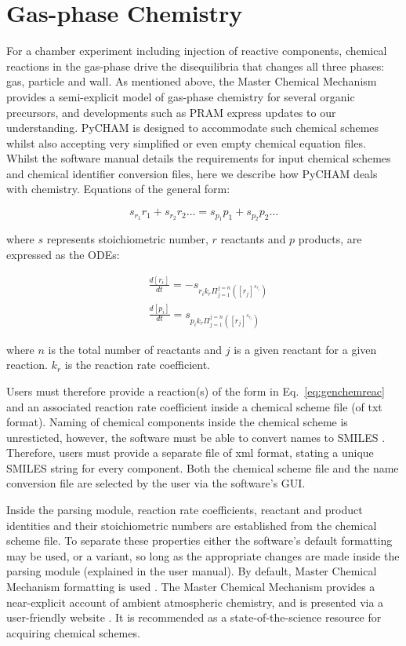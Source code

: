 \documentclass[gmd, manuscript]{copernicus}
\begin{document}
\section{Gas-phase Chemistry}

For a chamber experiment including injection of reactive components, chemical reactions in the gas-phase drive the disequilibria that changes all three phases: gas, particle and wall.  As mentioned above, the Master Chemical Mechanism provides a semi-explicit model of gas-phase chemistry for several organic precursors, and developments such as PRAM express updates to our understanding.  PyCHAM is designed to accommodate such chemical schemes whilst also accepting very simplified or even empty chemical equation files.  Whilst the software manual details the requirements for input chemical schemes and chemical identifier conversion files, here we describe how PyCHAM deals with chemistry.  Equations of the general form:

\begin{equation} \label{eq:genchemreac}
s_{r_{1}}r_{1}+s_{r_{2}}r_{2} \ldots=s_{p_{1}}p_{1}+s_{p_{2}}p_{2}\ldots
\end{equation}

where $s$ represents stoichiometric number, $r$ reactants and $p$ products, are expressed as the ODEs:

\begin{align} \label{eq:genchemode}
	&\frac{d[r_{i}]}{dt} = -s_{r_{i}k_r\Pi_{j=1}^{j=n}\left([r_j]^{s_{r_{j}}}\right)}\\
	&\frac{d[p_{i}]}{dt} = s_{p_{i}k_r\Pi_{j=1}^{j=n}\left([r_j]^{s_{r_{j}}}\right)} 
\end{align}

where $n$ is the total number of reactants and $j$ is a given reactant for a given reaction.  $k_r$ is the reaction rate coefficient.

Users must therefore provide a reaction(s) of the form in Eq.~\ref{eq:genchemreac} and an associated reaction rate coefficient inside a chemical scheme file (of txt format).  Naming of chemical components inside the chemical scheme is unresticted, however, the software must be able to convert names to SMILES \citep{Weininger1988}.  Therefore, users must provide a separate file of xml format, stating a unique SMILES string for every component.  Both the chemical scheme file and the name conversion file are selected by the user via the software's GUI.

Inside the parsing module, reaction rate coefficients, reactant and product identities and their stoichiometric numbers are established from the chemical scheme file.  To separate these properties either the software's default formatting may be used, or a variant, so long as the appropriate changes are made inside the parsing module (explained in the user manual).  By default, Master Chemical Mechanism formatting is used \citep{Jenkin1997, Saunders2003}.  The Master Chemical Mechanism provides a near-explicit account of ambient atmospheric chemistry, and is presented via a user-friendly website \citep{MCM2020}.  It is recommended as a state-of-the-science resource for acquiring chemical schemes.
\end{document}
